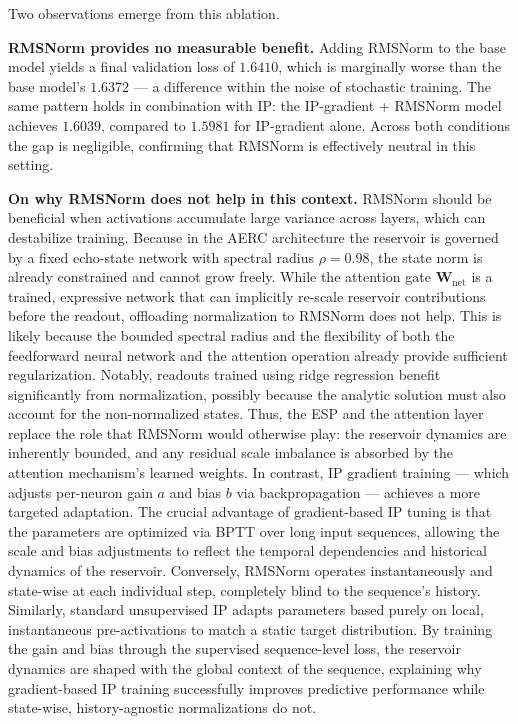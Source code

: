 \documentclass{sapthesis}
\begin{document}
Two observations emerge from this ablation.

\textbf{RMSNorm provides no measurable benefit.}
Adding RMSNorm to the base model yields a final validation loss of $1.6410$, which is marginally worse than the base model's $1.6372$ — a difference within the noise of stochastic training.
The same pattern holds in combination with IP: the IP-gradient + RMSNorm model achieves $1.6039$, compared to $1.5981$ for IP-gradient alone.
Across both conditions the gap is negligible, confirming that RMSNorm is effectively neutral in this setting.

\textbf{On why RMSNorm does not help in this context.}
RMSNorm should be beneficial when activations accumulate large variance across layers, which can destabilize training.
Because in the AERC architecture the reservoir is governed by a fixed echo-state network with spectral radius $\rho = 0.98$, the state norm is already constrained and cannot grow freely.
While the attention gate $\mathbf{W}_{\mathrm{net}}$ is a trained, expressive network that can implicitly re-scale reservoir contributions before the readout, offloading normalization to RMSNorm does not help. This is likely because the bounded spectral radius and the flexibility of both the feedforward neural network and the attention operation already provide sufficient regularization. Notably, readouts trained using ridge regression benefit significantly from normalization, possibly because the analytic solution must also account for the non-normalized states.
Thus, the ESP and the attention layer replace the role that RMSNorm would otherwise play: the reservoir dynamics are inherently bounded, and any residual scale imbalance is absorbed by the attention mechanism's learned weights.
In contrast, IP gradient training --- which adjusts per-neuron gain $a$ and bias $b$ via backpropagation --- achieves a more targeted adaptation. The crucial advantage of gradient-based IP tuning is that the parameters are optimized via BPTT over long input sequences, allowing the scale and bias adjustments to reflect the temporal dependencies and historical dynamics of the reservoir. Conversely, RMSNorm operates instantaneously and state-wise at each individual step, completely blind to the sequence's history. Similarly, standard unsupervised IP adapts parameters based purely on local, instantaneous pre-activations to match a static target distribution. By training the gain and bias through the supervised sequence-level loss, the reservoir dynamics are shaped with the global context of the sequence, explaining why gradient-based IP training successfully improves predictive performance while state-wise, history-agnostic normalizations do not.
\end{document}
